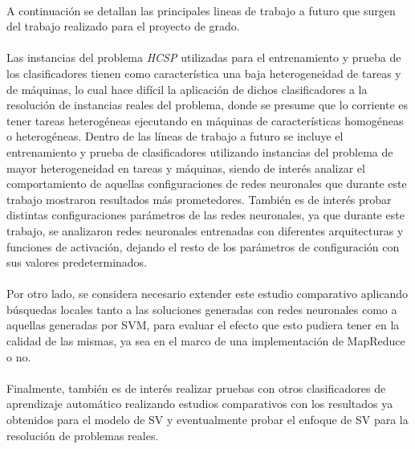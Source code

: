 \paragraph{}A continuación se detallan las principales lineas de trabajo a futuro que surgen del trabajo realizado para el proyecto de grado.

\paragraph{}Las instancias del problema \textit{HCSP} utilizadas para el entrenamiento y prueba de los clasificadores tienen como característica una baja heterogeneidad de tareas y de máquinas, lo cual hace difícil la aplicación de dichos clasificadores a la resolución de instancias reales del problema, donde se presume que lo corriente es tener tareas heterogéneas ejecutando en máquinas de características homogéneas o heterogéneas. Dentro de las líneas de trabajo a futuro se incluye el entrenamiento y prueba de clasificadores utilizando instancias del problema de mayor heterogeneidad en tareas y máquinas, siendo de interés analizar el comportamiento de aquellas configuraciones de redes neuronales que durante este trabajo mostraron resultados más prometedores. También es de interés probar distintas configuraciones parámetros de las redes neuronales, ya que durante este trabajo, se analizaron redes neuronales entrenadas con diferentes arquitecturas y funciones de activación, dejando el resto de los parámetros de configuración con sus valores predeterminados. 

\paragraph{}Por otro lado, se considera necesario extender este estudio comparativo aplicando búsquedas locales tanto a las soluciones generadas con redes neuronales como a aquellas generadas por SVM, para evaluar el efecto que esto pudiera tener en la calidad de las mismas, ya sea en el marco de una implementación de MapReduce o no.

\paragraph{}Finalmente, también es de interés realizar pruebas con otros clasificadores de aprendizaje automático realizando estudios comparativos con los resultados ya obtenidos para el modelo de SV y eventualmente probar el enfoque de SV para la resolución de problemas reales.
